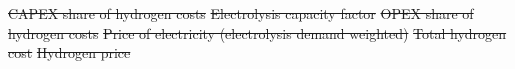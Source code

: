 \documentclass[5p,numafflabel]{elsarticle}
\providecommand{\DIFdeltex}[1]{{\protect\color{red}\sout{#1}}}                      %
\providecommand{\DIFdelFL}[1]{\DIFdel{#1}} %
\providecommand{\DIFdel}[1]{\texorpdfstring{\DIFdeltex{#1}}{}} %
\begin{document}
{%
\DIFdelFL{CAPEX share of hydrogen costs}}
{%
\DIFdelFL{Electrolysis capacity factor}}
{%
\DIFdelFL{OPEX share of hydrogen costs}}
{%
\DIFdelFL{Price of electricity (electrolysis demand weighted)}}
{%
\DIFdelFL{Total hydrogen cost}}
{%
\DIFdelFL{Hydrogen price}}
\end{document}
